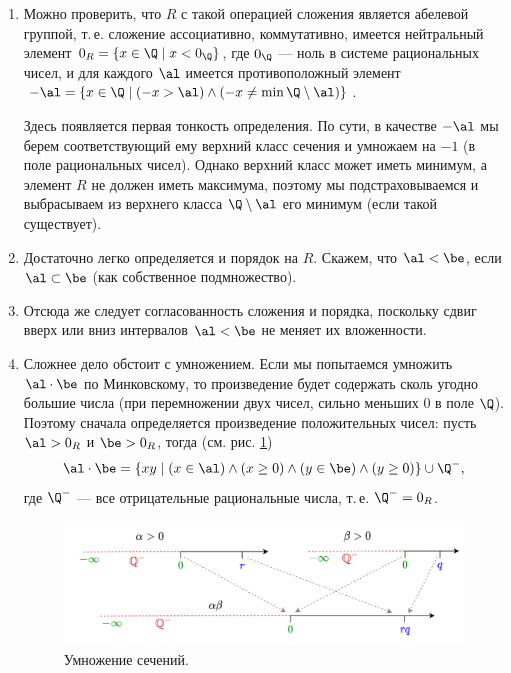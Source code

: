 \begin{enumerate}
\item Можно проверить, что $R$ с такой операцией сложения является абелевой группой, т.\,е. сложение ассоциативно, коммутативно, имеется нейтральный элемент $0_R=\{x\in\Q\mid x<0_\Q\}$, где $0_\Q$ --- ноль в системе рациональных чисел, и для каждого $\al$ имеется противоположный элемент $-\al=\{x\in\Q\mid (-x>\al)\land (-x\ne\min\Q\setminus\al)\}$.

Здесь появляется первая тонкость определения. По сути, в качестве $-\al$ мы берем соответствующий ему верхний класс сечения и умножаем на $-1$ (в поле рациональных чисел). Однако верхний класс может иметь минимум, а элемент $R$ не должен иметь максимума, поэтому мы подстраховываемся и выбрасываем из верхнего класса $\Q\setminus\al$ его минимум (если такой существует).

\item Достаточно легко определяется и порядок на $R$. Скажем, что $\al<\be$, если $\al\subset\be$ (как собственное подмножество).
\item Отсюда же следует согласованность сложения и порядка, поскольку сдвиг вверх или вниз интервалов $\al<\be$ не меняет их вложенности.
\item Сложнее дело обстоит с умножением. Если мы попытаемся умножить $\al\cdot\be$ по Минковскому, то произведение будет содержать сколь угодно большие числа (при перемножении двух чисел, сильно меньших 0 в поле $\Q$). Поэтому сначала определяется произведение положительных чисел: пусть $\al>0_R$ и $\be>0_R$, тогда (см. рис. \ref{MultingR})
$$
\al\cdot\be = \{xy\mid (x\in\al)\land(x\ge 0)\land(y\in\be)\land(y\ge 0)\}\cup\Q^-,
$$
где $\Q^-$ --- все отрицательные рациональные числа, т.\,е. $\Q^-=0_R$.

\begin{figure}[hbt!]
\begin{center}
\includegraphics[scale=0.25]{MultingR.png}
\end{center}\caption{Умножение сечений.} \label{MultingR}
\end{figure}



\end{enumerate}
